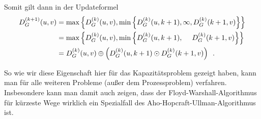 \documentclass[ngerman, a4paper, 12pt]{article}
\newcommand{\satzende}{\enskip \text{.}}
\theoremstyle{mystyle}
\begin{document}
	Somit gilt dann in der Updateformel 
	\begin{equation*}
		\begin{aligned}
			D_G^{(k+1)}(u,v) &= \max \menge{D_G^{(k)}(u,v) , \min\menge{D_G^{(k)}(u,k+1) , \infty, D_G^{(k)}(k+1,v)}} \\
			&=	\max \menge{D_G^{(k)}(u,v) , \min\menge{D_G^{(k)}(u,k+1), \phantom{\infty, } D_G^{(k)}(k+1,v)}} \\
			&= 	D_G^{(k)}(u,v) \oplus \brackets{D_G^{(k)}(u,k+1) \odot D_G^{(k)}(k+1,v)} 
			\satzende
		\end{aligned}
	\end{equation*}

	So wie wir diese Eigenschaft hier für das Kapazitätsproblem gezeigt haben, kann man für alle weiteren Probleme (außer dem Prozessproblem) verfahren. Insbesondere kann man damit auch zeigen, dass der Floyd-Warshall-Algorithmus für kürzeste Wege wirklich ein Spezialfall des Aho-Hopcraft-Ullman-Algorithmus ist.

	
\end{document}
